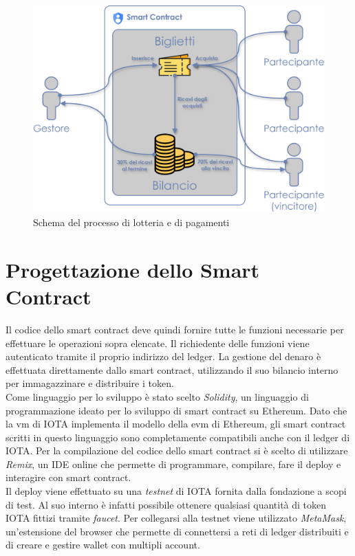 \documentclass[12pt,a4paper,openright,twoside]{report}
\begin{document}
\begin{figure}[h]
\begin{center}
\includegraphics[width=\textwidth]{figures/my_app_diagram.png}
\caption[Schema dell'applicazione]{Schema del processo di lotteria e di pagamenti}\label{fig:app_diagram}
\end{center}
\end{figure}
\section{Progettazione dello Smart Contract}
Il codice dello smart contract deve quindi fornire tutte le funzioni necessarie per effettuare le operazioni sopra elencate. Il richiedente delle funzioni viene autenticato tramite il proprio indirizzo del ledger. La gestione del denaro è effettuata direttamente dallo smart contract, utilizzando il suo bilancio interno per immagazzinare e distribuire i token.\\
Come linguaggio per lo sviluppo è stato scelto \textit{Solidity}, un linguaggio di programmazione ideato per lo sviluppo di smart contract su Ethereum. Dato che la \acrshort{vm} di IOTA implementa il modello della \acrshort{evm} di Ethereum, gli smart contract scritti in questo linguaggio sono completamente compatibili anche con il ledger di IOTA. Per la compilazione del codice dello smart contract si è scelto di utilizzare \textit{Remix}, un IDE online che permette di programmare, compilare, fare il deploy e interagire con smart contract.\\
Il deploy viene effettuato su una \textit{testnet} di IOTA fornita dalla fondazione a scopi di test. Al suo interno è infatti possibile ottenere qualsiasi quantità di token IOTA fittizi tramite \textit{faucet}. Per collegarsi alla testnet viene utilizzato \textit{MetaMask}, un'estensione del browser che permette di connettersi a reti di ledger distribuiti e di creare e gestire wallet con multipli account. 
\newpage
\end{document}
